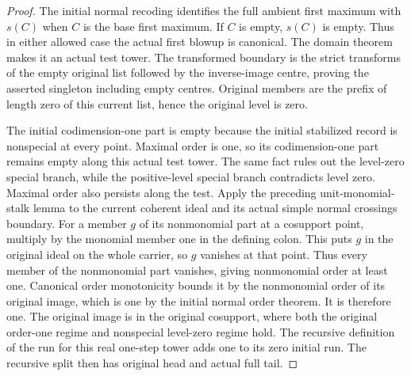 \begin{proof}
The initial normal recoding identifies the full ambient first maximum
with $s(C)$ when $C$ is the base first maximum. If $C$ is empty, $s(C)$ is
empty. Thus in either allowed case the actual first blowup is canonical.
The domain theorem makes it an actual test tower. The transformed boundary
is the strict transforms of the empty original list followed by the
inverse-image centre, proving the asserted singleton including empty centres.
Original members are the prefix of length zero of this current list, hence
the original level is zero.

The initial codimension-one part is empty because the initial stabilized
record is nonspecial at every point. Maximal order is one, so its
codimension-one part remains empty along this actual test tower. The same
fact rules out the level-zero special branch, while the positive-level
special branch contradicts level zero. Maximal order also persists along
the test. Apply the preceding unit-monomial-stalk lemma to the current
coherent ideal and its actual simple normal crossings boundary. For a member
$g$ of its nonmonomial part at a cosupport point, multiply by the monomial
member one in the defining colon. This puts $g$ in the original ideal on
the whole carrier, so $g$ vanishes at that point. Thus every member of the
nonmonomial part vanishes, giving nonmonomial order at least one. Canonical order
monotonicity bounds it by the nonmonomial order of its original image,
which is one by the initial normal order theorem. It is therefore one.
The original image is in the original cosupport, where both the original
order-one regime and nonspecial level-zero regime hold. The recursive
definition of the run for this real one-step tower adds one to its zero
initial run. The recursive split then has original head and actual full tail.
\end{proof}

